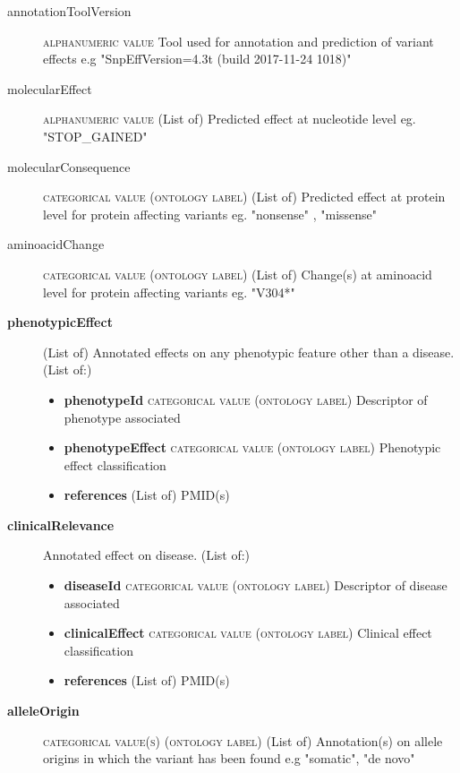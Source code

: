 \documentclass[a4paper, 10pt]{article}        %
\begin{document}
\begin{description}
\begin{itemize}
	\end{itemize} 
	\item[annotationToolVersion] {\textsc{alphanumeric value}} Tool used for annotation and prediction of variant effects e.g "SnpEffVersion=4.3t (build 2017-11-24 1018)"
	\item[molecularEffect] {\textsc{alphanumeric value}} (List of) Predicted effect at nucleotide level eg. "STOP\_GAINED"
	\item[molecularConsequence]  {\textsc{categorical value (ontology label)}} (List of) Predicted effect at protein level for protein affecting variants eg. "nonsense" , "missense"
	\item[aminoacidChange]  {\textsc{categorical value (ontology label)}} (List of) Change(s) at aminoacid level for protein affecting variants eg. "V304*"
	\item[\textbf{phenotypicEffect}] (List of) Annotated effects on any phenotypic feature other than a disease. (List of:)
		\begin{itemize}
				\item[] \textbf{phenotypeId} {\textsc{categorical value (ontology label)}} Descriptor of phenotype associated
				\item[] \textbf{phenotypeEffect} {\textsc{categorical value (ontology label)}} Phenotypic effect classification
				\item[] \textbf{references} (List of) PMID(s)
		\end{itemize} 
	\item[\textbf{clinicalRelevance}] Annotated effect on disease. (List of:)
			\begin{itemize}
				\item[] \textbf{diseaseId} {\textsc{categorical value (ontology label)}} Descriptor of disease associated
				\item[] \textbf{clinicalEffect} {\textsc{categorical value (ontology label)}} Clinical effect classification
				\item[] \textbf{references} (List of) PMID(s)
		\end{itemize} 
	\item[\textbf{alleleOrigin}] {\textsc{categorical value(s) (ontology label)}} (List of) Annotation(s) on allele origins in which the variant has been found e.g "somatic", "de novo"
 \end{description}
 


  
\end{document}
